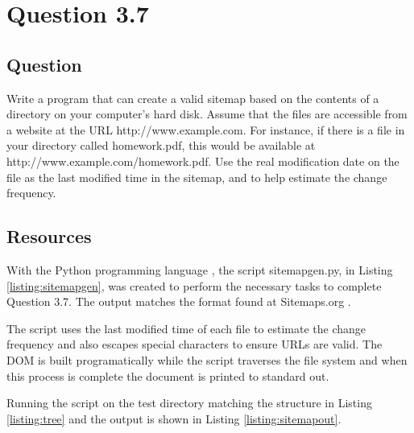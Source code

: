 \section{Question 3.7}

\subsection{Question}
Write a program that can create a valid sitemap based on the contents of a directory on your computer's hard disk. Assume that the files are accessible from a website at the URL http://www.example.com. For instance, if there is a file in your directory called homework.pdf, this would be available at http://www.example.com/homework.pdf. Use the real modification date on the file as the last modified time in the sitemap, and to help estimate the change frequency.

\subsection{Resources}
With the Python programming language \cite{python}, the script {\ttfamily sitemapgen.py}, in Listing \ref{listing:sitemapgen}, was created to perform the necessary tasks to complete Question 3.7.  The output matches the format found at Sitemaps.org \cite{sitemaps}.

The script uses the last modified time of each file to estimate the change frequency and also escapes special characters to ensure URLs are valid.  The DOM is built programatically while the script traverses the file system and when this process is complete the document is printed to standard out.

Running the script on the test directory matching the structure in Listing \ref{listing:tree} and the output is shown in Listing \ref{listing:sitemapout}.




